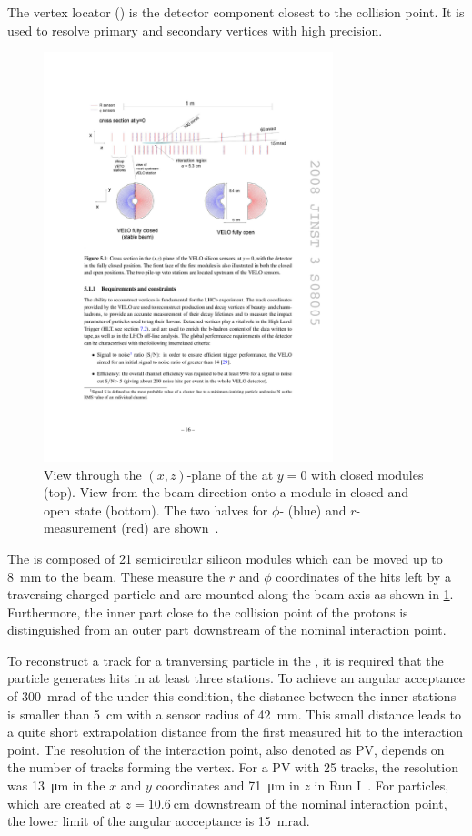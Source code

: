 The vertex locator (\velo) is the detector component closest to the collision point.
It is used to resolve primary and secondary vertices with high precision.
\begin{figure}[tbp]
    \centering
    \includegraphics[width=0.75\textwidth]{05lhcb/figs/velo.pdf}
    \caption{View through the $(x,z)$-plane of the \velo at $y=0$ with closed modules (top).
    View from the beam direction onto a module in closed and open state (bottom).
    The two halves for $\phi$- (blue) and $r$-measurement (red) are shown~\cite{Alves:2008zz}.}
    \label{fig:velo}
\end{figure}
The \velo is composed of \num{21} semicircular silicon modules which can be moved up to \SI{8}{\milli\metre} to the beam.
These measure the $r$ and $\phi$ coordinates of the hits left by a traversing charged particle and are mounted along the beam axis as shown in \cref{fig:velo}.
Furthermore, the inner part close to the collision point of the protons is distinguished from an outer part downstream of the nominal interaction point.

To reconstruct a track for a tranversing particle in the \velo, it is required that the particle generates hits in at least three stations.
To achieve an angular acceptance of \SI{300}{\milli\radian} of the \velo under this condition, the distance between the inner stations is smaller than \SI{5}{\centi\metre} with a sensor radius of \SI{42}{\milli\metre}.
This small distance leads to a quite short extrapolation distance from the first measured hit to the interaction point.
The resolution of the interaction point, also denoted as \ac{PV}, depends on the number of tracks forming the vertex.
For a \ac{PV} with \num{25} tracks, the resolution was \SI{13}{\micro\metre} in the $x$ and $y$ coordinates and \SI{71}{\micro\metre} in $z$ in Run I~\cite{Aaij:2014jba}.
For particles, which are created at $z=\SI{10.6}{\centi\metre}$ downstream of the nominal interaction point, the lower limit of the angular accceptance is \SI{15}{\milli\radian}.

